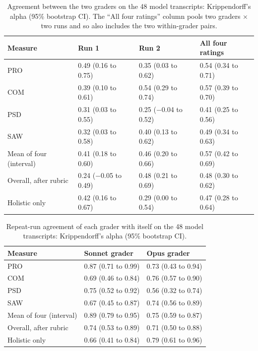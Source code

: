 \documentclass[11pt]{article}
\begin{document}
\begin{table}[htbp]
\centering
\small
\caption[Agreement between the two graders]{Agreement between the two graders on the 48 model transcripts: Krippendorff's alpha (95\% bootstrap CI). The ``All four ratings'' column pools two graders $\times$ two runs and so also includes the two within-grader pairs.}
\label{tab:inter}
\begin{tabular}{@{}llll@{}}
\toprule
Measure & Run 1 & Run 2 & All four ratings \\
\midrule
PRO & 0.49 (0.16 to 0.75) & 0.35 (0.03 to 0.62) & 0.54 (0.34 to 0.71) \\
COM & 0.39 (0.10 to 0.61) & 0.54 (0.29 to 0.74) & 0.57 (0.39 to 0.70) \\
PSD & 0.31 (0.03 to 0.55) & 0.25 ($-$0.04 to 0.52) & 0.41 (0.25 to 0.56) \\
SAW & 0.32 (0.03 to 0.58) & 0.40 (0.13 to 0.62) & 0.49 (0.34 to 0.63) \\
Mean of four (interval) & 0.41 (0.18 to 0.60) & 0.46 (0.20 to 0.66) & 0.57 (0.42 to 0.69) \\
Overall, after rubric & 0.24 ($-$0.05 to 0.49) & 0.48 (0.21 to 0.69) & 0.48 (0.30 to 0.62) \\
Holistic only & 0.42 (0.16 to 0.67) & 0.29 (0.00 to 0.54) & 0.47 (0.28 to 0.64) \\
\bottomrule
\end{tabular}
\end{table}

\begin{table}[htbp]
\centering
\small
\caption[Repeat-run agreement of each grader with itself]{Repeat-run agreement of each grader with itself on the 48 model transcripts: Krippendorff's alpha (95\% bootstrap CI).}
\label{tab:repeat}
\begin{tabular}{@{}lll@{}}
\toprule
Measure & Sonnet grader & Opus grader \\
\midrule
PRO & 0.87 (0.71 to 0.99) & 0.73 (0.43 to 0.94) \\
COM & 0.69 (0.46 to 0.84) & 0.76 (0.57 to 0.90) \\
PSD & 0.75 (0.52 to 0.92) & 0.56 (0.32 to 0.74) \\
SAW & 0.67 (0.45 to 0.87) & 0.74 (0.56 to 0.89) \\
Mean of four (interval) & 0.89 (0.79 to 0.95) & 0.75 (0.59 to 0.87) \\
Overall, after rubric & 0.74 (0.53 to 0.89) & 0.71 (0.50 to 0.88) \\
Holistic only & 0.66 (0.41 to 0.84) & 0.79 (0.61 to 0.96) \\
\bottomrule
\end{tabular}
\end{table}
\end{document}
